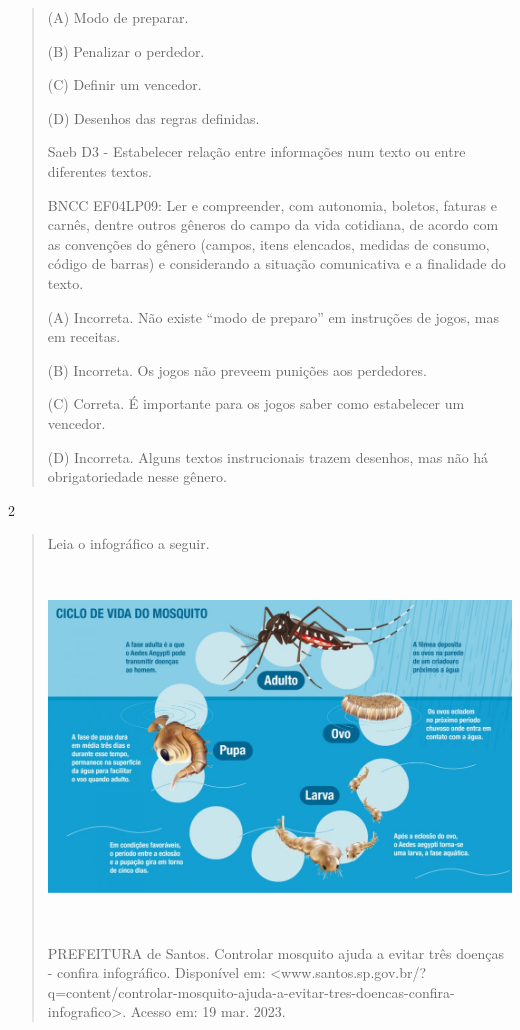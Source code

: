 \begin{itemize}
{{{\begin{itemize}
\begin{itemize}
\begin{itemize}
\begin{quote}
(A) Modo de preparar.

(B) Penalizar o perdedor.

(C) Definir um vencedor.

(D) Desenhos das regras definidas.

Saeb D3 - Estabelecer relação entre informações num texto ou entre
diferentes textos.

BNCC EF04LP09: Ler e compreender, com autonomia, boletos, faturas e
carnês, dentre outros gêneros do campo da vida cotidiana, de acordo com
as convenções do gênero (campos, itens elencados, medidas de consumo,
código de barras) e considerando a situação comunicativa e a finalidade
do texto.

(A) Incorreta. Não existe ``modo de preparo'' em instruções de jogos,
mas em receitas.

(B) Incorreta. Os jogos não preveem punições aos perdedores.

(C) Correta. É importante para os jogos saber como estabelecer um
vencedor.

(D) Incorreta. Alguns textos instrucionais trazem desenhos, mas não há
obrigatoriedade nesse gênero.
\end{quote}

\num{2}

\begin{quote}
Leia o infográfico a seguir.

\includegraphics[width=5.90556in,height=3.72118in]{media/image37.jpeg}

PREFEITURA de Santos. Controlar mosquito ajuda a evitar três doenças -
confira infográfico. Disponível em:
\textless{}www.santos.sp.gov.br/?q=content/controlar-mosquito-ajuda-a-evitar-tres-doencas-confira-infografico\textgreater{}.
Acesso em: 19 mar. 2023.


\end{quote}
\end{itemize}
\end{itemize}
\end{itemize}}}}
\end{itemize}
